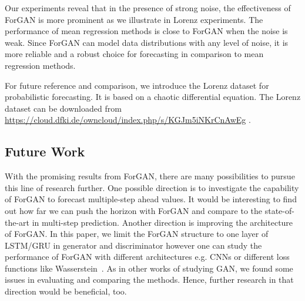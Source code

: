 \documentclass{ieeeaccess}
\begin{document}
Our experiments reveal that in the presence of strong noise, the effectiveness of ForGAN is more prominent as we illustrate in Lorenz experiments. The performance of mean regression methods is close to ForGAN when the noise is weak. Since ForGAN can model data distributions with any level of noise, it is more reliable and a robust choice for forecasting in comparison to mean regression methods.

For future reference and comparison, we introduce the Lorenz dataset for probabilistic forecasting. It is based on a chaotic differential equation. The Lorenz dataset can be downloaded from \underline{https://cloud.dfki.de/owncloud/index.php/}\break\underline{s/KGJm5iNKrCnAwEg} .

\subsection{Future Work}
With the promising results from ForGAN, there are many possibilities to pursue this line of research further. One possible direction is to investigate the capability of ForGAN to forecast multiple-step ahead values. It would be interesting to find out how far we can push the horizon with ForGAN and compare to the state-of-the-art in multi-step prediction. Another direction is improving the architecture of ForGAN. In this paper, we limit the ForGAN structure to one layer of LSTM/GRU in generator and discriminator however one can study the performance of ForGAN with different architectures e.g. CNNs or different loss functions like Wasserstein~\cite{arjovsky2017wasserstein}. As in other works of studying GAN, we found some issues in evaluating and comparing the methods. Hence, further research in that direction would be beneficial, too.




\EOD
\end{document}
